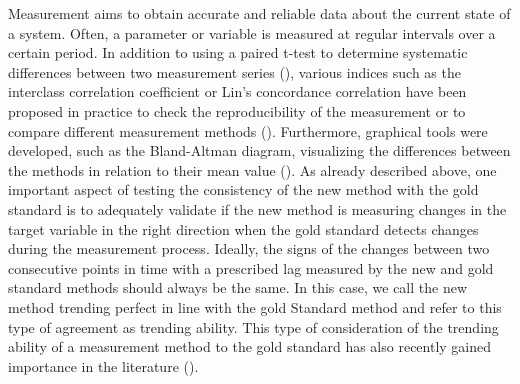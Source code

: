 Measurement aims to obtain accurate and reliable data about the current state of a system. Often, a parameter or variable is measured at regular intervals over a certain period. In addition to using a paired t-test to determine systematic differences between two measurement series (\cite{watson2010method}), various indices such as the interclass correlation coefficient or Lin's concordance correlation have been proposed in practice to check the reproducibility of the measurement or to compare different measurement methods (\cite{lawrence1989concordance,koo2016guideline}). Furthermore, graphical tools were developed, such as the Bland-Altman diagram, visualizing the differences between the methods in relation to their mean value (\cite{bland1986statistical}). As already described above, one important aspect of testing the consistency of the new method with the gold standard is to adequately validate if the new method is measuring changes in the target variable in the right direction when the gold standard detects changes during the measurement process. 
Ideally, the signs of the changes between two consecutive points in time with a prescribed lag measured by the new and gold standard methods should always be the same. 
In this case, we call the new method trending perfect in line with the gold Standard method and refer to this type of agreement as trending ability. 
This type of consideration of the trending ability of a measurement method to the gold standard has also recently gained importance in the literature (\cite{saugel2015tracking, saugel2018error, hiraishi2021concordance}). 


